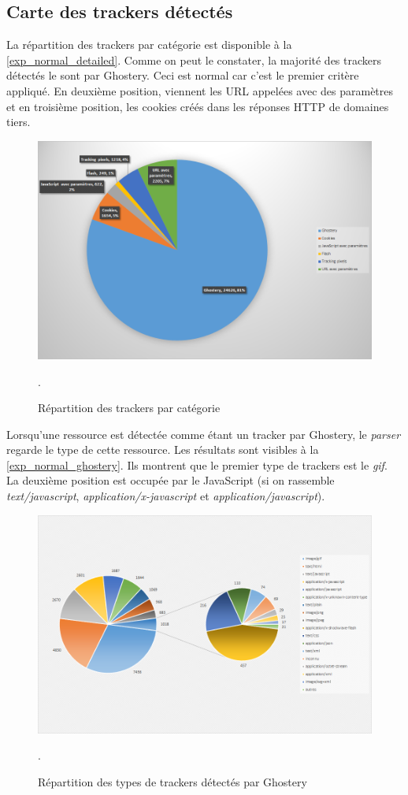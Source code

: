 \subsection{Carte des trackers détectés}
La répartition des trackers par catégorie est disponible à la \autoref{exp_normal_detailed}. Comme on peut le constater, la majorité des trackers détectés le sont par Ghostery. Ceci est normal car c'est le premier critère appliqué. En deuxième position, viennent les URL appelées avec des paramètres et en troisième position, les cookies créés dans les réponses HTTP de domaines tiers.

\begin{figure}[h]
	\centering
	\includegraphics[scale=.60]{Analyses_graphiques/Normal_detailed.png}
	\caption{\label{exp_normal_detailed}Répartition des trackers par catégorie}.
\end{figure}

Lorsqu'une ressource est détectée comme étant un tracker par Ghostery, le \textit{parser} regarde le type de cette ressource. Les résultats sont visibles à la \autoref{exp_normal_ghostery}. Ils montrent que le premier type de trackers est le \textit{gif}. La deuxième position est occupée par le JavaScript (si on rassemble \textit{text/javascript}, \textit{application/x-javascript} et \textit{application/javascript}).
\begin{figure}[h]
	\centering
	\includegraphics[scale=.60]{Analyses_graphiques/Normal_ghostery.png}
	\caption{\label{exp_normal_ghostery}Répartition des types de trackers détectés par Ghostery}.
\end{figure}

